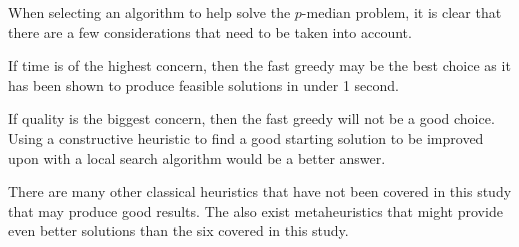 \documentclass[11pt]{article}
\newcommand{\np}{\newpage}
\begin{document}
	When selecting an algorithm to help solve the $p$-median problem, it is clear that there are a few considerations that need to be taken into account.
	
	If time is of the highest concern, then the fast greedy may be the best choice as it has been shown to produce feasible solutions in under 1 second.
	
	If quality is the biggest concern, then the fast greedy will not be a good choice.  Using a constructive heuristic to find a good starting solution to be improved upon with a local search algorithm would be a better answer.
	
	There are many other classical heuristics that have not been covered in this study that may produce good results.  The also exist metaheuristics that might provide even better solutions than the six covered in this study.
			
	\np
	
	
	\np

	\printindex[terms]
	\printindex[authors]
	
\end{document}
